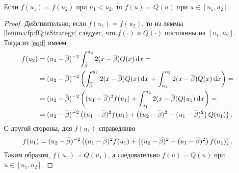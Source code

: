 \begin{lemma}
  \label{lemma:f=Q}
  Если $f(u_1) = f(u_2)$ при $u_1 < u_2$, то $f(u) = Q(u)$ при $u \in [u_1,
  u_2]$.
\end{lemma}
\begin{proof}
  Действительно, если $f(u_1) = f(u_2)$, то из леммы
  \ref{lemma:fp:fQ:isStrategy} следует, что $f(\cdot)$ и $Q(\cdot)$ постоянны на
  $[u_1, u_2]$. Тогда из \eqref{eq:f} имеем
  \begin{align*}
    f(u_2)
    &= (u_2 - {\overline{\beta}})^{-2} \int_{{\overline{\beta}}}^{u_2} 2 (x - {\overline{\beta}}) Q(x) \mathop{}\!\mathrm{d} x = \\
    &= (u_2 - {\overline{\beta}})^{-2} \left(
      \int_{{\overline{\beta}}}^{u_1} 2 (x - {\overline{\beta}}) Q(x) \mathop{}\!\mathrm{d} x \, +
      \int_{u_1}^{u_2} 2 (x - {\overline{\beta}}) Q(x) \mathop{}\!\mathrm{d} x
      \right) = \\
    &= (u_2 - {\overline{\beta}})^{-2} \left(
      (u_1 - {\overline{\beta}})^2 f(u_1) +
      \int_{u_1}^{u_2} 2 (x - {\overline{\beta}}) Q(u_1) \mathop{}\!\mathrm{d} x
      \right) = \\
    &= (u_2 - {\overline{\beta}})^{-2} \left(
      (u_1 - {\overline{\beta}})^2 f(u_1) +
      \left( (u_2 - {\overline{\beta}})^2 - (u_1 - {\overline{\beta}})^2 \right) Q(u_1)
      \right).
  \end{align*}
  С другой стороны, для $f(u_1)$ справедливо
  \begin{equation*}
    f(u_1) = (u_2 - {\overline{\beta}})^{-2} \left(
      (u_1 - {\overline{\beta}})^2 f(u_1) +
      \left( (u_2 - {\overline{\beta}})^2 - (u_1 - {\overline{\beta}})^2 \right) f(u_1)
    \right).
  \end{equation*}
  Таким образом, $f(u_1) = Q(u_1)$, а следовательно $f(u) = Q(u)$ при $u \in
  [u_1, u_2]$.
\end{proof}

